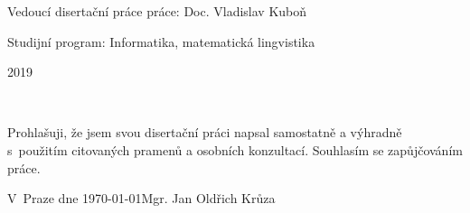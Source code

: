 \documentclass[12pt,notitlepage]{report}
\begin{document}
\begin{titlepage}
\large
\noindent Vedoucí disertační práce práce: Doc. Vladislav Kuboň

\noindent Studijní program: Informatika, matematická lingvistika

\vspace{20mm}

\begin{center}
2019
\end{center}

\end{titlepage} %

\thispagestyle{empty} %
\normalsize %
\ \vspace{10mm} 


\vspace{\fill} %
\noindent Prohlašuji, že jsem svou disertační práci napsal samostatně a výhradně
s~použitím citovaných pramenů a osobních konzultací. Souhlasím se zapůjčováním
práce.

\bigskip
\noindent V~Praze dne \today \hspace{\fill}Mgr. Jan Oldřich Krůza

\setcounter{page}{2} %
\tableofcontents %

\newpage %



\newpage













\end{document}
